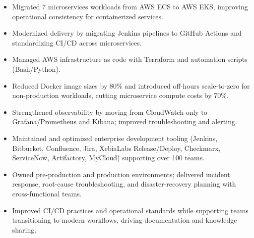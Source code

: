 \documentclass[10pt,a4paper]{altacv}
\begin{document}
\begin{itemize}
\item Migrated 7 microservices workloads from AWS ECS to AWS EKS, improving operational consistency for containerized services.
\item Modernized delivery by migrating Jenkins pipelines to GitHub Actions and standardizing CI/CD across microservices.
\item Managed AWS infrastructure as code with Terraform and automation scripts (Bash/Python).
\item Reduced Docker image sizes by 80\% and introduced off-hours scale-to-zero for non-production workloads, cutting microservice compute costs by 70\%.
\item Strengthened observability by moving from CloudWatch-only to Grafana/Prometheus and Kibana; improved troubleshooting and alerting.
\end{itemize}

\divider
\clearpage
{}

\begin{itemize}
\item Maintained and optimized enterprise development tooling (Jenkins, Bitbucket, Confluence, Jira, XebiaLabs Release/Deploy, Checkmarx, ServiceNow, Artifactory, MyCloud) supporting over 100 teams.
\item Owned pre-production and production environments; delivered incident response, root-cause troubleshooting, and disaster-recovery planning with cross-functional teams.
\item Improved CI/CD practices and operational standards while supporting teams transitioning to modern workflows, driving documentation and knowledge sharing.
\end{itemize}

\divider
\end{document}
